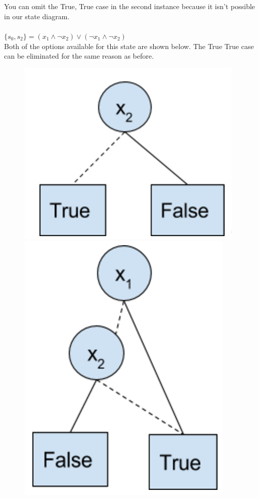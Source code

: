 \documentclass{article}
\begin{document}
\\ \\ You can omit the True, True case in the second instance because it isn't possible in our state diagram.\\
\\ $\{s_0,s_2\} = (x_1 \land \neg x_2) \lor (\neg x_1 \land \neg x_2)$ \\
Both of the options available for this state are shown below. The True True case can be eliminated for the same reason as before.
\begin{figure}[!htb]
  \includegraphics[width=\linewidth]{6b2.png}
\endminipage\hfill
{}
  \includegraphics[width=\linewidth]{6b3.png}
\endminipage
\end{figure}
\end{document}
